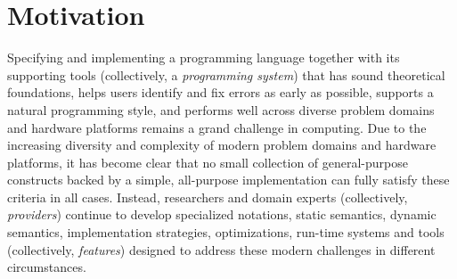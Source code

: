 \vspace{-25pt}
\section{Motivation}\label{motivation}
Specifying and implementing a programming language together with its supporting tools (collectively, a \emph{programming system}) that has sound theoretical foundations, helps users identify and fix errors as early as possible, supports a natural programming style, and performs well across diverse problem domains and hardware platforms remains a grand challenge in computing. Due to the increasing diversity and complexity of modern problem domains and hardware platforms, it has become clear that no small  collection of general-purpose constructs backed by a simple, all-purpose implementation can fully satisfy these criteria in all cases. Instead,  researchers and domain experts (collectively, \emph{providers}) continue to develop  specialized notations,  static semantics, dynamic semantics, implementation strategies, optimizations, run-time systems and tools (collectively, \emph{features})  designed to address these modern challenges in different circumstances. %


